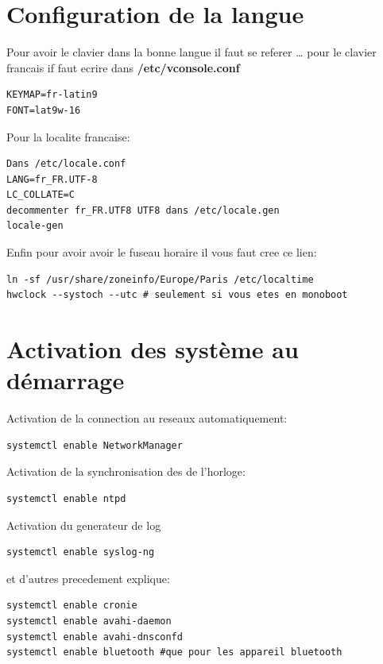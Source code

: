 \documentclass[a4paper]{book}
\begin{document}
\chapter{Configuration de la langue}
Pour avoir le clavier dans la bonne langue il faut se referer \ldots
pour le clavier francais if faut ecrire dans \textbf{/etc/vconsole.conf}
\\
\begin{lstlisting}
KEYMAP=fr-latin9
FONT=lat9w-16
\end{lstlisting}
Pour la localite francaise\@:\\
\begin{lstlisting}
Dans /etc/locale.conf
LANG=fr_FR.UTF-8
LC_COLLATE=C
decommenter fr_FR.UTF8 UTF8 dans /etc/locale.gen
locale-gen
\end{lstlisting}
Enfin pour avoir avoir le fuseau horaire il vous faut cree ce lien\@:\\
\begin{lstlisting}
ln -sf /usr/share/zoneinfo/Europe/Paris /etc/localtime
hwclock --systoch --utc # seulement si vous etes en monoboot
\end{lstlisting}
\chapter{Activation des système au démarrage}
Activation de la connection au reseaux automatiquement\@:\\
\begin{lstlisting}
systemctl enable NetworkManager
\end{lstlisting}
Activation de la synchronisation des de l'horloge\@:\\
\begin{lstlisting}
systemctl enable ntpd
\end{lstlisting}
Activation du  generateur de log\\
\begin{lstlisting}
systemctl enable syslog-ng
\end{lstlisting}
et d'autres precedement explique\@:\\
\begin{lstlisting}
systemctl enable cronie
systemctl enable avahi-daemon
systemctl enable avahi-dnsconfd
systemctl enable bluetooth #que pour les appareil bluetooth
\end{lstlisting}
\end{document}
